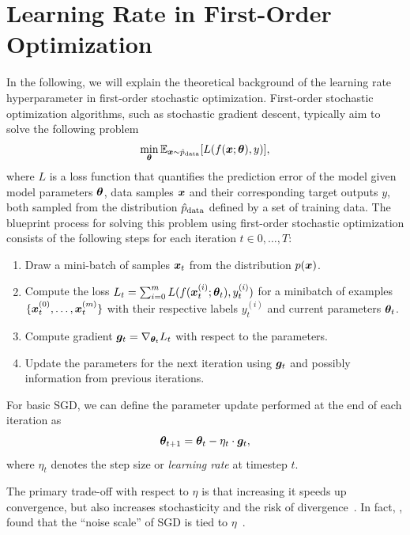 \documentclass{article} %
\begin{document}
\section{Learning Rate in First-Order Optimization}

In the following, we will explain the theoretical background of the learning rate hyperparameter in first-order stochastic optimization.
First-order stochastic optimization algorithms, such as stochastic gradient descent, typically aim to solve the following problem
\begin{equation}
   \min_{{\bm{\theta}}} \mathbb{E}_{{\bm{x}} \sim \hat{p}_{\rm{data}}} [L(f({\bm{x}}; {\bm{\theta}}), y)],
\end{equation}
where $L$ is a loss function that quantifies the prediction error of the model given model parameters ${\bm{\theta}}$, data samples ${\bm{x}}$ and their corresponding target outputs $y$, both sampled from the distribution $\hat{p}_{\rm{data}}$ defined by a set of training data.
The blueprint process for solving this problem using first-order stochastic optimization consists of the following steps for each iteration $t \in 0, \ldots, T$:
\begin{enumerate}
   \item Draw a mini-batch of samples ${\bm{x}}_t$ from the distribution $p({\bm{x}})$.
   \item Compute the loss $L_t = \sum_{i=0}^{m}L(f({\bm{x}}_t^{(i)}; {\bm{\theta}}_t), y_t^{(i)})$ for a minibatch of examples $\{ {\bm{x}}_t^{(0)}, \ldots, {\bm{x}}_t^{(m)} \}$ with their respective labels $y_t^{(i)}$ and current parameters ${\bm{\theta}}_t$.
   \item Compute gradient ${\bm{g}}_t = \nabla_{{\bm{\theta}}_t} L_t$ with respect to the parameters.
   \item Update the parameters for the next iteration using ${\bm{g}}_t$ and possibly information from previous iterations.
\end{enumerate}

For basic SGD, we can define the parameter update performed at the end of each iteration as
\begin{equation}\label{eq:sgd_update}
   {\bm{\theta}}_{t+1}  = {\bm{\theta}}_{t} - \eta_t \cdot {\bm{g}}_t,
\end{equation}
where $\eta_t$ denotes the step size or \textit{learning rate} at timestep $t$.

The primary trade-off with respect to $\eta$ is that increasing it speeds up convergence, but also increases stochasticity and the risk of divergence~\citep{bengioPracticalRecommendationsGradientbased2012}.
In fact, \citet{smithBayesianPerspectiveGeneralization2018}, found that the “noise scale” of SGD is tied to $\eta$~\citep{smithBayesianPerspectiveGeneralization2018}.
\end{document}
